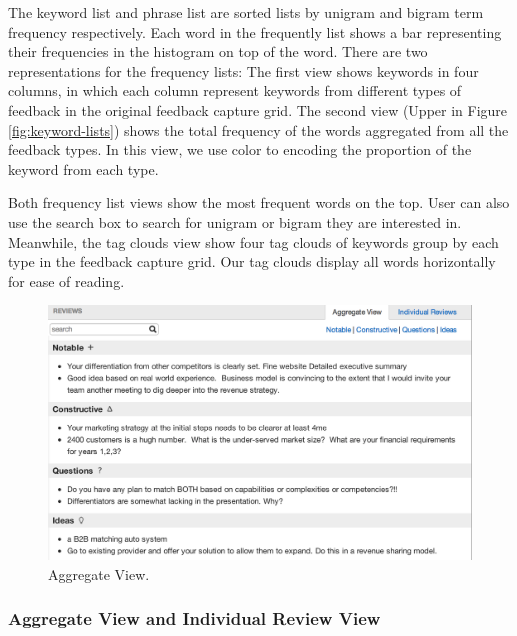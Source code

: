 \documentclass{sigchi}
\begin{document}
The keyword list and phrase list are sorted lists by unigram and
bigram term frequency respectively.  Each word in the frequently list shows a bar representing their
frequencies in the histogram on top of the word.  There are two representations for the frequency lists: The first view shows keywords in four columns, in which each column represent keywords from different types of feedback in the original feedback capture grid.
The second view (Upper in Figure \ref{fig:keyword-lists}) shows the total frequency of the words aggregated from all the feedback types.  In this view, we use color to encoding the proportion of the keyword from each type.

Both frequency list views show the most frequent words on the top.  User can
also use the search box to search for unigram or bigram they are interested in.
Meanwhile, the tag clouds view show four tag clouds of keywords group by each
type in the feedback capture grid.  Our tag clouds display all words
horizontally for ease of reading.


\begin{figure}[]
\centering
\includegraphics[width=1.4\columnwidth]{images/aggregate-view}
\caption{Aggregate View.}
\label{fig:aggregate-view}
\end{figure}

\subsubsection{Aggregate View and Individual Review View}
\end{document}
